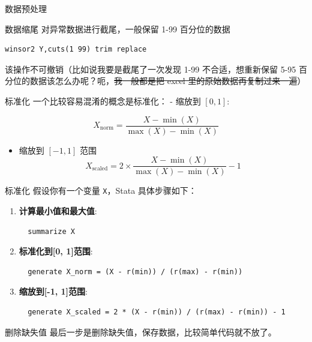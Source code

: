 \documentclass[
  ignorenonframetext,
  aspectratio=169,
  fontset=ubuntu]{ctexbeamer}
\providecommand{\tightlist}{%
  \setlength{\itemsep}{0pt}\setlength{\parskip}{0pt}}
\providecommand{\st}[1]{\CJKsout{#1}}
\renewcommand{\st}[1]{\sout{#1}}
\begin{document}
\begin{frame}[fragile]{数据预处理}
\label{ux6570ux636eux9884ux5904ux7406-1}
\begin{block}{数据缩尾}
\label{ux6570ux636eux7f29ux5c3e}
对异常数据进行截尾，一般保留 1-99 百分位的数据

\begin{verbatim}
winsor2 Y,cuts(1 99) trim replace
\end{verbatim}

该操作不可撤销（比如说我要是截尾了一次发现 1-99 不合适，想重新保留 5-95
百分位的数据该怎么办呢？呃，\st{我一般都是把 excel
里的原始数据再复制过来一遍}）
\end{block}
\end{frame}

\begin{frame}[fragile]{标准化}
\label{ux6807ux51c6ux5316}
一个比较容易混淆的概念是标准化： - 缩放到 \([0, 1]\):

\[
   X_{\text{norm}} = \frac{X - \min(X)}{\max(X) - \min(X)}
\]

\begin{itemize}
\tightlist
\item
  缩放到 \([-1, 1]\) 范围 \[
   X_{\text{scaled}} = 2 \times \frac{X - \min(X)}{\max(X) - \min(X)} - 1
  \]
\end{itemize}
\end{frame}

\begin{frame}[fragile]{标准化}
\label{ux6807ux51c6ux5316-1}
假设你有一个变量 \texttt{X}，Stata 具体步骤如下：

\begin{enumerate}
\item
  \textbf{计算最小值和最大值}:

  \begin{verbatim}
  summarize X
  \end{verbatim}
\item
  \textbf{标准化到{[}0, 1{]}范围}:

  \begin{verbatim}
  generate X_norm = (X - r(min)) / (r(max) - r(min))
  \end{verbatim}
\item
  \textbf{缩放到{[}-1, 1{]}范围}:

  \begin{verbatim}
  generate X_scaled = 2 * (X - r(min)) / (r(max) - r(min)) - 1
  \end{verbatim}
\end{enumerate}

\begin{block}{删除缺失值}
\label{ux5220ux9664ux7f3aux5931ux503c}
最后一步是删除缺失值，保存数据，比较简单代码就不放了。
\end{block}
\end{frame}
\end{document}
